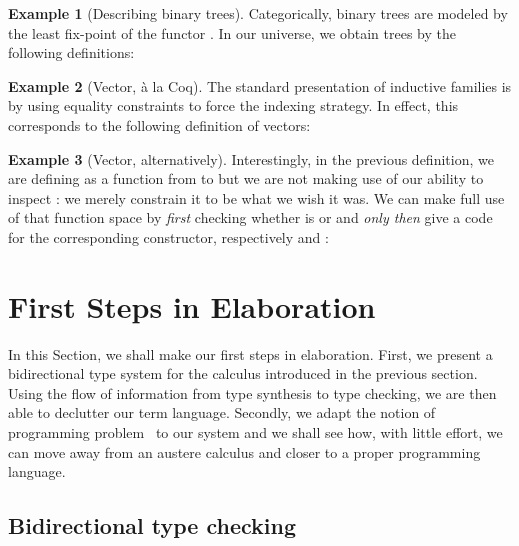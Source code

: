 \documentclass{scrartcl}
\theoremstyle{plain}
\theoremstyle{definition}
\newtheorem{example}{Example}
\begin{document}
\newcommand{\TreeD}{\Function{TreeD}}

\begin{example}[Describing binary trees]

Categorically, binary trees are modeled by the least fix-point of the
functor . In our universe, we obtain trees by the following definitions:

\end{example}

\fi

\begin{example}[Vector, \`{a} la Coq]
  
  The standard presentation of inductive families is by using equality
  constraints to force the indexing strategy. In effect, this
  corresponds to the following definition of vectors:


\end{example}

\begin{example}[Vector, alternatively]

  Interestingly, in the previous definition, we are defining
   as a function from  to
   but we are not making use of our ability to inspect
  : we merely constrain it to be what we wish it was. We
  can make full use of that function space by \emph{first} checking
  whether  is  or  and \emph{only
    then} give a code for the corresponding constructor, respectively
   and :

  

\end{example}





\section{First Steps in Elaboration}
\label{sec:elab-course}

In this Section, we shall make our first steps in elaboration. First,
we present a bidirectional type system for the calculus introduced in
the previous section. Using the flow of information from type
synthesis to type checking, we are then able to declutter our term
language. Secondly, we adapt the notion of programming
problem~\citep{mcbride.mckinna:view-from-the-left} to our system and
we shall see how, with little effort, we can move away from an austere
calculus and closer to a proper programming language.



\subsection{Bidirectional type checking}
\end{document}
